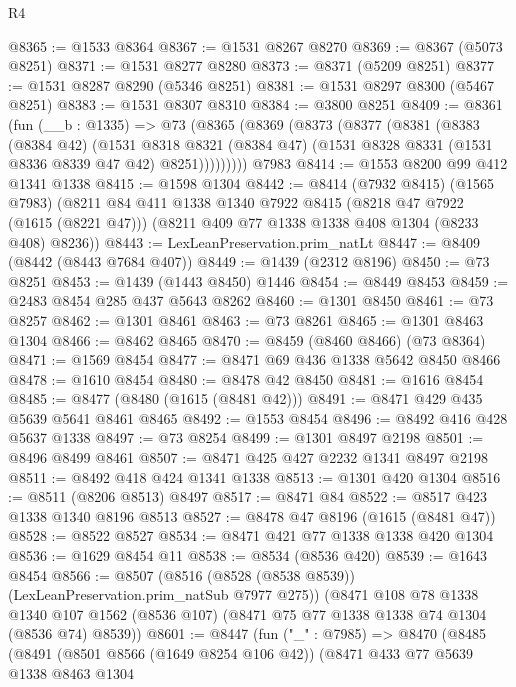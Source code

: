 \begin{lexlean}{R4}
\begin{coremodule}
@8365 := @1533 @8364
@8367 := @1531 @8267 @8270
@8369 := @8367 (@5073 @8251)
@8371 := @1531 @8277 @8280
@8373 := @8371 (@5209 @8251)
@8377 := @1531 @8287 @8290 (@5346 @8251)
@8381 := @1531 @8297 @8300 (@5467 @8251)
@8383 := @1531 @8307 @8310
@8384 := @3800 @8251
@8409 := @8361
    (fun (__b : @1335) =>
    @73
      (@8365
        (@8369
          (@8373
            (@8377
              (@8381
                (@8383
                  (@8384 @42)
                  (@1531
                    @8318
                    @8321
                    (@8384 @47)
                    (@1531 @8328 @8331 (@1531 @8336 @8339 @47 @42) @8251)))))))))
    @7983
@8414 := @1553 @8200 @99 @412 @1341 @1338
@8415 := @1598 @1304
@8442 := @8414
    (@7932 @8415)
    (@1565 @7983)
    (@8211
      @84
      @411
      @1338
      @1340
      @7922
      @8415
      (@8218 @47 @7922 (@1615 (@8221 @47)))
      (@8211 @409 @77 @1338 @1338 @408 @1304 (@8233 @408) @8236))
@8443 := LexLeanPreservation.prim_natLt
@8447 := @8409 (@8442 (@8443 @7684 @407))
@8449 := @1439 (@2312 @8196)
@8450 := @73 @8251
@8453 := @1439 (@1443 @8450) @1446
@8454 := @8449 @8453
@8459 := @2483 @8454 @285 @437 @5643 @8262
@8460 := @1301 @8450
@8461 := @73 @8257
@8462 := @1301 @8461
@8463 := @73 @8261
@8465 := @1301 @8463 @1304
@8466 := @8462 @8465
@8470 := @8459 (@8460 @8466) (@73 @8364)
@8471 := @1569 @8454
@8477 := @8471 @69 @436 @1338 @5642 @8450 @8466
@8478 := @1610 @8454
@8480 := @8478 @42 @8450
@8481 := @1616 @8454
@8485 := @8477 (@8480 (@1615 (@8481 @42)))
@8491 := @8471 @429 @435 @5639 @5641 @8461 @8465
@8492 := @1553 @8454
@8496 := @8492 @416 @428 @5637 @1338
@8497 := @73 @8254
@8499 := @1301 @8497 @2198
@8501 := @8496 @8499 @8461
@8507 := @8471 @425 @427 @2232 @1341 @8497 @2198
@8511 := @8492 @418 @424 @1341 @1338
@8513 := @1301 @420 @1304
@8516 := @8511 (@8206 @8513) @8497
@8517 := @8471 @84
@8522 := @8517 @423 @1338 @1340 @8196 @8513
@8527 := @8478 @47 @8196 (@1615 (@8481 @47))
@8528 := @8522 @8527
@8534 := @8471 @421 @77 @1338 @1338 @420 @1304
@8536 := @1629 @8454 @11
@8538 := @8534 (@8536 @420)
@8539 := @1643 @8454
@8566 := @8507
    (@8516 (@8528 (@8538 @8539)) (LexLeanPreservation.prim_natSub @7977 @275))
    (@8471
      @108
      @78
      @1338
      @1340
      @107
      @1562
      (@8536 @107)
      (@8471 @75 @77 @1338 @1338 @74 @1304 (@8536 @74) @8539))
@8601 := @8447
    (fun ("_" : @7985) =>
    @8470
      (@8485
        (@8491
          (@8501 @8566 (@1649 @8254 @106 @42))
          (@8471
            @433
            @77
            @5639
            @1338
            @8463
            @1304

\end{coremodule}
\end{lexlean}
